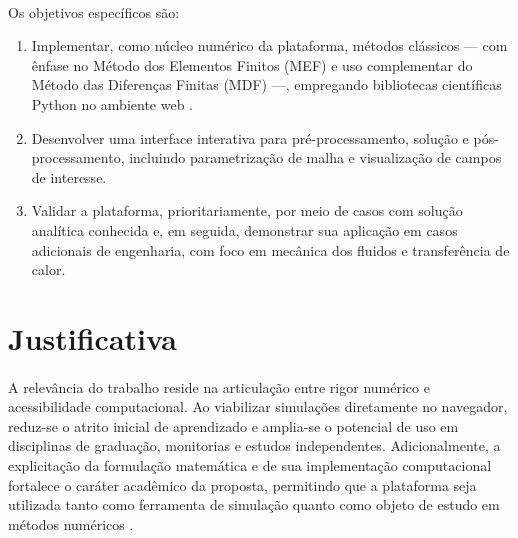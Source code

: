 \paragraph{}Os objetivos específicos são:
\begin{enumerate}
    \item Implementar, como núcleo numérico da plataforma, métodos clássicos --- com ênfase no Método dos Elementos Finitos (MEF) e uso complementar do Método das Diferenças Finitas (MDF) ---, empregando bibliotecas científicas Python no ambiente web \cite{Harris2020}.
    \item Desenvolver uma interface interativa para pré-processamento, solução e pós-processamento, incluindo parametrização de malha e visualização de campos de interesse.
    \item Validar a plataforma, prioritariamente, por meio de casos com solução analítica conhecida e, em seguida, demonstrar sua aplicação em casos adicionais de engenharia, com foco em mecânica dos fluidos e transferência de calor.
\end{enumerate}

\section{Justificativa}

\paragraph{}A relevância do trabalho reside na articulação entre rigor numérico e acessibilidade computacional. Ao viabilizar simulações diretamente no navegador, reduz-se o atrito inicial de aprendizado e amplia-se o potencial de uso em disciplinas de graduação, monitorias e estudos independentes. Adicionalmente, a explicitação da formulação matemática e de sua implementação computacional fortalece o caráter acadêmico da proposta, permitindo que a plataforma seja utilizada tanto como ferramenta de simulação quanto como objeto de estudo em métodos numéricos \cite{Fish2007}.

